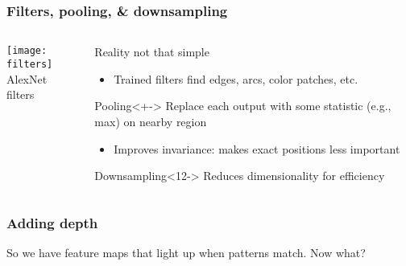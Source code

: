 \begin{frame}
    \frametitle{Filters, pooling, \& downsampling}

    \begin{columns}
        \begin{column}{0.4\textwidth}
            \centering
            \texttt{[image: filters]} \\
            {\footnotesize AlexNet filters \citep{KrizhevskyNIPS12}}
            \vspace{5mm}

            
        \end{column}

        \begin{column}{0.6\textwidth}
            Reality not that simple
            \begin{itemize}
                \item Trained filters find edges, arcs, color patches, etc.
            \end{itemize}

            \setcounter{beamerpauses}{2}

            \begin{block}{Pooling}<+->
                Replace each output with some statistic (e.g., max) on nearby region
            \end{block}

            \begin{itemize}[<.->]
                \item Improves invariance: makes exact positions less important
            \end{itemize}

            \begin{block}{Downsampling}<12->
                Reduces dimensionality for efficiency
            \end{block}
        \end{column}
    \end{columns}
\end{frame}

\begin{frame}
    \frametitle{Adding depth}

    

    So we have feature maps that light up when patterns match.
    Now what?%
\end{frame}

